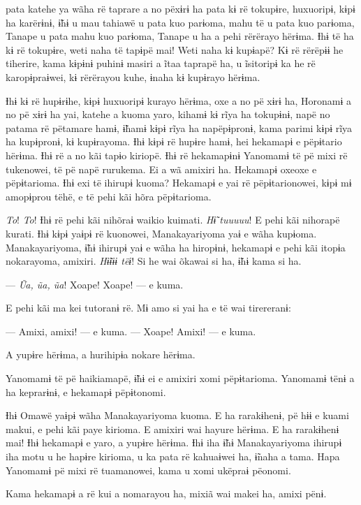  pata katehe ya wãha rë taprare a no pëxɨrɨ ha pata kɨ rë tokupɨre,
huxuoripɨ, kɨpɨ ha karërɨnɨ, ɨ̃hɨ u mau tahiawë u pata kuo parɨoma, mahu
të u pata kuo parɨoma, Tanape u pata mahu kuo parɨoma, Tanape u ha a
pehi rërërayo hërɨma. Ɨhɨ të ha kɨ rë tokupɨre, weti naha të tapɨpë mai!
Weti naha kɨ kupɨapë? Kɨ rë rërëpɨɨ he tiherire, kama kɨpɨnɨ puhinɨ
masiri a ĩtaa taprapë ha, u ĩsitoripɨ ka he rë karopɨpraɨwei, kɨ
rërërayou kuhe, ɨnaha kɨ kupɨrayo hërɨma.

Ɨhɨ kɨ rë hupɨrɨhe, kɨpɨ huxuoripɨ kurayo hërɨma, oxe a no pë xɨrɨ ha,
Horonamɨ a no pë xɨrɨ ha yai, katehe a kuoma yaro, kihamɨ kɨ rĩya ha
tokupɨnɨ, napë no patama rë pëtamare hamɨ, ɨ̃hamɨ kɨpɨ rĩya ha
napëpɨpronɨ, kama parimi kɨpɨ rĩya ha kupɨpronɨ, kɨ kupɨrayoma. Ɨhɨ kɨpɨ
rë hupɨre hamɨ, hei hekamapɨ e pëpɨtario hërɨma. Ɨhɨ rë a no kãi tapɨo
kiriopë. Ɨhɨ rë hekamapɨnɨ Yanomamɨ të pë mixi rë tukenowei, të pë napë
rurukema. Ei a wã amixiri ha. Hekamapɨ oxeoxe e pëpɨtarioma. Ɨhɨ exi të
ihirupɨ kuoma? Hekamapɨ e yai rë pëpɨtarionowei, kɨpɨ mɨ amopɨprou tëhë,
e të pehi kãi hõra pëpɨtarioma. 

\textit{To}! \textit{To}! Ɨhɨ rë pehi kãi nihõraɨ waikio kuimati. \textit{Hɨ̃ tuuuuu}! E pehi kãi
nihorapë kurati. Ɨhɨ kɨpɨ yaɨpɨ rë kuonowei, Manakayariyoma yaɨ e wãha
kupɨoma. Manakayariyoma, ɨ̃hɨ ihirupɨ yaɨ e wãha ha hiropɨnɨ, hekamapɨ e
pehi kãi itopɨa nokarayoma, amixiri. \textit{Hɨ̃ɨɨɨ tëɨ}! Si he wai õkawai si ha,
ɨ̃hɨ kama si ha. 

--- \textit{Ũa, ũa, ũa}! Xoape! Xoape! --- e kuma. 

E pehi kãi ma kei tutoranɨ rë. Mɨ amo si yai ha e të wai tirereranɨ:

--- Amixi, amixi! --- e kuma. --- Xoape! Amixi! --- e kuma. 

A yupɨre hërɨma, a hurihipɨa nokare hërɨma. 

Yanomamɨ të pë haikiamapë, ɨ̃hɨ ei e amixiri xomi pëpɨtarioma. Yanomamɨ
tënɨ a ha keprarɨnɨ, e hekamapɨ pëpɨtonomi. 

Ɨhɨ Omawë yaɨpɨ wãha Manakayariyoma kuoma. E ha rarakɨhenɨ, pë hɨɨ e
 kuami makui, e pehi kãi paye kirioma. E amixiri wai hayure hërɨma. E ha
 rarakɨhenɨ mai! Ɨhɨ hekamapɨ e yaro, a yupɨre hërɨma. Ɨhɨ iha ɨ̃hɨ
 Manakayariyoma ihirupɨ iha motu u he hapɨre kirioma, u ka pata rë
 kahuaɨwei ha, ɨ̃naha a tama. Hapa Yanomamɨ pë mixi rë tuamanowei, kama u
 xomi ukëpraɨ pëonomi. 

Kama hekamapɨ a rë kui a nomarayou ha, mixiã wai makei ha, amixi pënɨ. 

